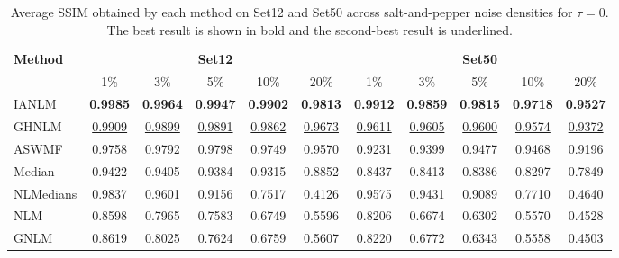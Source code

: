\documentclass[pdflatex,iicol,sn-mathphys-num]{sn-jnl}
\newcommand{\method}{IANLM\xspace}
\newcommand{\ghnlm}{GHNLM\xspace}
\newcommand{\nlm}{NLM\xspace}
\newcommand{\gnlm}{GNLM\xspace}
\newcommand{\aswmf}{ASWMF\xspace}
\newcommand{\nlmedian}{NLMedians\xspace}
\begin{document}
\begin{table}[!t]
  \centering
  \caption{Average SSIM obtained by each method on Set12 and Set50 across salt-and-pepper noise densities for $\tau=0$. The best result is shown in bold and the second-best result is underlined.}
  \label{tab:ssim_tau0_by_density}
  \scriptsize
  \setlength{\tabcolsep}{4pt}
  \renewcommand{\arraystretch}{1.12}
  \begin{tabular*}{\textwidth}{@{\extracolsep{\fill}}lccccc|ccccc}
  \toprule
  \multirow{2}{*}{\textbf{Method}} &
  \multicolumn{5}{c|}{\textbf{Set12}} &
  \multicolumn{5}{c}{\textbf{Set50}} \\
  \cmidrule(lr){2-6}\cmidrule(lr){7-11}
  & 1\% & 3\% & 5\% & 10\% & 20\%
  & 1\% & 3\% & 5\% & 10\% & 20\% \\
  \midrule
  \method   & \textbf{0.9985} & \textbf{0.9964} & \textbf{0.9947} & \textbf{0.9902} & \textbf{0.9813}
            & \textbf{0.9912} & \textbf{0.9859} & \textbf{0.9815} & \textbf{0.9718} & \textbf{0.9527} \\
  \ghnlm    & \underline{0.9909} & \underline{0.9899} & \underline{0.9891} & \underline{0.9862} & \underline{0.9673}
            & \underline{0.9611} & \underline{0.9605} & \underline{0.9600} & \underline{0.9574} & \underline{0.9372} \\
  \aswmf    & 0.9758 & 0.9792 & 0.9798 & 0.9749 & 0.9570
            & 0.9231 & 0.9399 & 0.9477 & 0.9468 & 0.9196 \\
  Median    & 0.9422 & 0.9405 & 0.9384 & 0.9315 & 0.8852
            & 0.8437 & 0.8413 & 0.8386 & 0.8297 & 0.7849 \\
  \nlmedian & 0.9837 & 0.9601 & 0.9156 & 0.7517 & 0.4126
            & 0.9575 & 0.9431 & 0.9089 & 0.7710 & 0.4640 \\
  \nlm      & 0.8598 & 0.7965 & 0.7583 & 0.6749 & 0.5596
            & 0.8206 & 0.6674 & 0.6302 & 0.5570 & 0.4528 \\
  \gnlm     & 0.8619 & 0.8025 & 0.7624 & 0.6759 & 0.5607
            & 0.8220 & 0.6772 & 0.6343 & 0.5558 & 0.4503 \\
  \bottomrule
  \end{tabular*}
\end{table}
\end{document}

